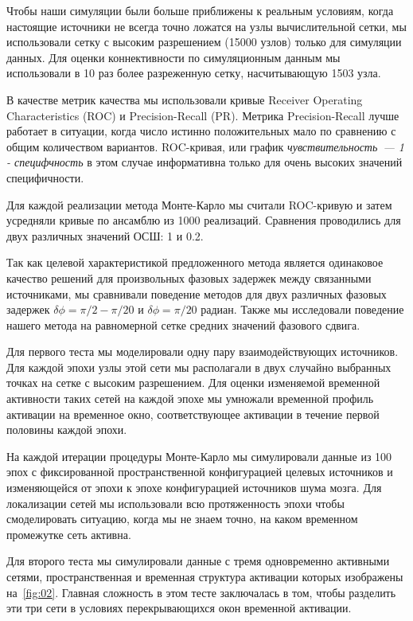 Чтобы наши симуляции были больше приближены к реальным условиям, когда настоящие источники
не всегда точно ложатся на узлы вычислительной сетки, мы использовали сетку с высоким
разрешением (15000 узлов) только для симуляции данных. Для оценки
коннективности по симуляционным данным мы использовали в 10 раз более разреженную сетку,
насчитывающую 1503 узла.

В качестве метрик качества мы использовали кривые Receiver Operating Characteristics (ROC)
и Precision-Recall (PR). Метрика Precision-Recall лучше работает в ситуации, когда
число истинно положительных мало по сравнению с общим количеством вариантов.
ROC-кривая, или график \emph{чувствительность~--- 1 - специфчность} в этом случае информативна
только для очень высоких значений специфичности.

Для каждой реализации метода Монте-Карло мы считали ROC-кривую и затем
усредняли кривые по ансамблю из 1000 реализаций. Сравнения проводились для двух различных
значений ОСШ: 1 и 0.2. 

Так как целевой характеристикой предложенного метода является одинаковое качество
решений для произвольных фазовых задержек между связанными источниками, мы сравнивали
поведение методов для двух различных фазовых задержек $\delta\phi=\pi/2-\pi/20$ и
$\delta\phi=\pi/20$ радиан. Также мы исследовали поведение нашего метода на
равномерной сетке средних значений фазового сдвига.

Для первого теста мы моделировали одну пару взаимодействующих источников. Для каждой эпохи
узлы этой сети мы располагали в двух случайно выбранных точках на сетке с высоким разрешением.
Для оценки изменяемой временной активности таких сетей на каждой эпохе мы умножали временной
профиль активации на временное окно, соответствующее активации в течение первой половины
каждой эпохи. %

На каждой итерации процедуры Монте-Карло мы симулировали данные из 100 эпох с фиксированной
пространственной конфигурацией целевых источников и изменяющейся от эпохи к эпохе конфигурацией
источников шума мозга. Для локализации сетей мы использовали всю протяженность эпохи
чтобы смоделировать ситуацию, когда мы не знаем точно, на каком временном промежутке
сеть активна.

Для второго теста мы симулировали данные с тремя одновременно активными сетями, пространственная
и временная структура активации которых изображены на~\ref{fig:02}.
Главная сложность в этом тесте заключалась в том, чтобы разделить эти три сети в условиях
перекрывающихся окон временной активации.

